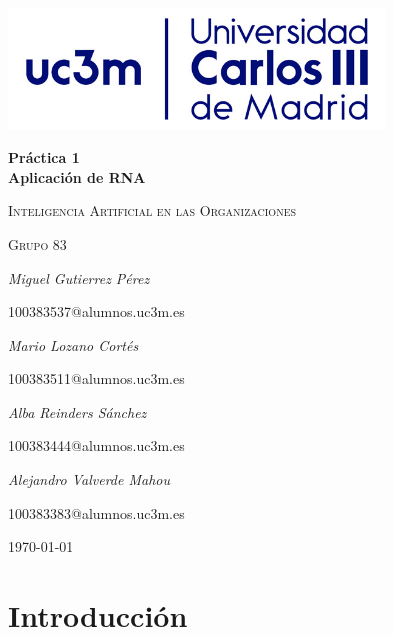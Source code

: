 \documentclass[12pt,a4paper, xcolor=table]{article}
\begin{document}
\setlength{\parindent}{0pt}
\begin{titlepage}
        \centering
        \includegraphics[width=0.75\textwidth]{img/logo_uc3m.jpg}\par\vspace{3cm}
        {\huge\bfseries Práctica 1 \\ Aplicación de RNA\par}
        \vspace{0.5cm}
        {\scshape\Large Inteligencia Artificial en las Organizaciones\par}
        \vspace{1.5cm}
        {\scshape\Large Grupo 83\par}
        \vspace{1.5cm}
        {\Large\itshape Miguel Gutierrez Pérez\par}
        {\Large 100383537@alumnos.uc3m.es \par}
        \vspace{1cm}
        {\Large\itshape Mario Lozano Cortés\par}
        {\Large 100383511@alumnos.uc3m.es\par}
        \vspace{1cm}
        {\Large\itshape Alba Reinders Sánchez\par}
        {\Large 100383444@alumnos.uc3m.es\par}
        \vspace{1cm}
        {\Large\itshape Alejandro Valverde Mahou\par}
        {\Large 100383383@alumnos.uc3m.es\par}
        \vfill

        {\large \today\par}
\end{titlepage}

\tableofcontents

\newpage

\section{Introducción}
    
\end{document}
